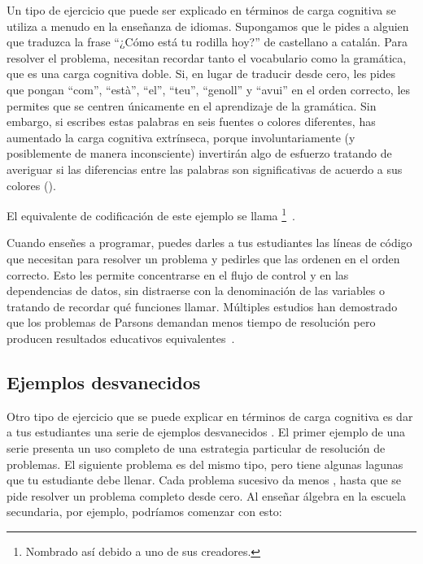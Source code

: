 Un tipo de ejercicio que puede ser explicado en términos de carga cognitiva
se utiliza a menudo en la enseñanza de idiomas.
Supongamos que le pides a alguien que traduzca la frase
``¿Cómo está tu rodilla hoy?'' de castellano a catalán.
Para resolver el problema, necesitan recordar tanto el vocabulario
como la gramática, que es una carga cognitiva doble.
Si, en lugar de traducir desde cero, les pides que pongan ``com'', ``està'', ``el'', ``teu'', ``genoll'' y ``avui'' en el orden correcto,
les permites que se centren únicamente en el aprendizaje de la gramática.
Sin embargo, si escribes estas palabras en seis fuentes o colores diferentes,
has aumentado la carga cognitiva extrínseca, porque involuntariamente
(y posiblemente de manera inconsciente) invertirán algo de esfuerzo tratando de averiguar
si las diferencias entre las palabras son significativas de acuerdo a sus colores ().


El equivalente de codificación de este ejemplo
se llama \footnote{Nombrado así debido a uno de sus creadores.}~\cite{Pars2006}.

Cuando enseñes a programar,
puedes darles a tus estudiantes las líneas de código que necesitan para resolver un problema
y pedirles que las ordenen en el orden correcto.
Esto les permite concentrarse en el flujo de control y en las dependencias de datos,
sin distraerse con la denominación de las variables o tratando de recordar qué funciones llamar.
Múltiples estudios han demostrado que los problemas de Parsons demandan menos tiempo de resolución pero producen resultados educativos equivalentes~\cite{Eric2017}.


\subsection*{Ejemplos desvanecidos}

Otro tipo de ejercicio que se puede explicar en términos de carga cognitiva
es dar a tus estudiantes una serie de ejemplos desvanecidos .
El primer ejemplo de una serie presenta un uso completo de una estrategia
particular de resolución de problemas.
El siguiente problema es del mismo tipo,
pero tiene algunas lagunas que tu estudiante debe llenar.
Cada problema sucesivo da menos ,
hasta que se pide resolver un problema completo desde cero.
Al enseñar álgebra en la escuela secundaria,
por ejemplo,
podríamos comenzar con esto:


